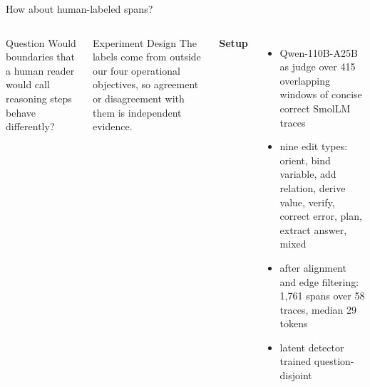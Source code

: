 \documentclass[aspectratio=169,10pt]{beamer}
\begin{document}
\begin{frame}{How about human-labeled spans?}
\begin{columns}[T,onlytextwidth]
\begin{block}{Question}
Would boundaries that a human reader would call reasoning steps behave differently?
\end{block}
\vspace{0.2cm}
\begin{block}{Experiment Design}
\small The labels come from outside our four operational objectives, so agreement or disagreement with them is independent evidence.
\end{block}
\small
\textbf{Setup}
\begin{itemize}\setlength\itemsep{4pt}
  \item Qwen-110B-A25B as judge over 415 overlapping windows of concise correct SmolLM traces
  \item nine edit types: orient, bind variable, add relation, derive value, verify, correct error, plan, extract answer, mixed
  \item after alignment and edge filtering: 1{,}761 spans over 58 traces, median 29 tokens
  \item latent detector trained question-disjoint
\end{itemize}
\end{columns}
\end{frame}
\end{document}
